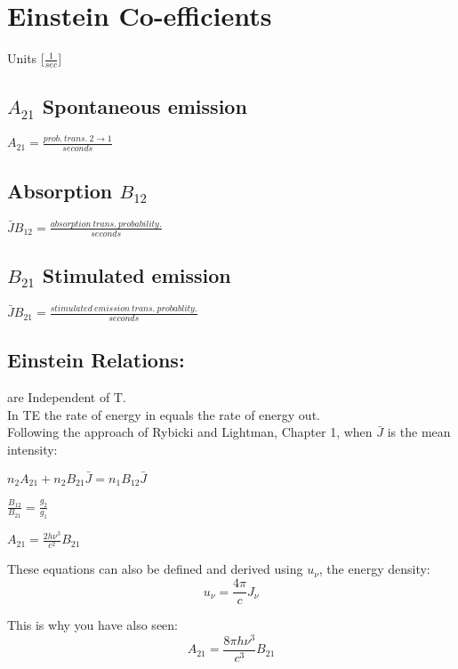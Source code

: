 \documentclass[12pt]{report}
\begin{document}
\section{Einstein Co-efficients}
Units [\( \frac{1}{sec}]\) 
\subsection{$A_{21}$ Spontaneous emission}
\( A_{21}=\frac{prob. \ trans.\ 2 \rightarrow 1}{seconds} \)
\subsection{Absorption $B_{12}$}
\( \bar{J} B_{12}=\frac{absorption \ trans. \ probability.}{seconds} \)

\subsection{$B_{21}$ Stimulated emission}
\( \bar{J} B_{21}=\frac{stimulated \ emission\ trans.\ probablity.}{seconds} \)

\subsection{Einstein Relations:} 
are Independent of T.\\
In TE the rate of energy in equals the rate of energy out.\\


Following the approach of Rybicki and Lightman, Chapter 1, when $\bar{J}$ is the mean intensity:

\begin{centering}

 \( n_2A_{21}+n_2B_{21}\bar{J}=n_1B_{12}\bar{J} \)
 
\(\boxed{\frac{B_{12}}{B_{21}}=\frac{g_2}{g_1} }\)

\(\boxed{A_{21}=\frac{2h\nu^3}{c^2}B_{21} } \)

\end{centering}

These equations can also be defined and derived using $u_\nu$, the energy density:
\begin{equation}
u_\nu=\frac{4\pi}{c} J_\nu
\end{equation}

This is why you have also seen:
\begin{equation}
{A_{21}=\frac{8\pi h\nu^3}{c^3}B_{21} }
\end{equation}
\end{document}
